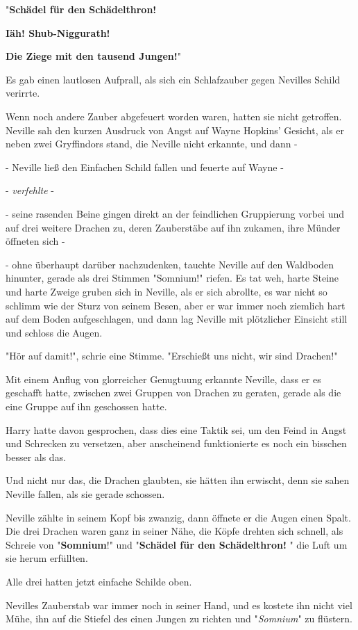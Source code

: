 {"\textbf{Schädel für den Schädelthron!}

\textbf{Iäh! Shub-Niggurath!}

\textbf{Die Ziege mit den tausend Jungen!}"

Es gab einen lautlosen Aufprall, als sich ein Schlafzauber gegen Nevilles Schild verirrte.

Wenn noch andere Zauber abgefeuert worden waren, hatten sie nicht getroffen. Neville sah den kurzen Ausdruck von Angst auf Wayne Hopkins' Gesicht, als er neben zwei Gryffindors stand, die Neville nicht erkannte, und dann -

- Neville ließ den Einfachen Schild fallen und feuerte auf Wayne -

- \emph{verfehlte} -

- seine rasenden Beine gingen direkt an der feindlichen Gruppierung vorbei und auf drei weitere Drachen zu, deren Zauberstäbe auf ihn zukamen, ihre Münder öffneten sich -

- ohne überhaupt darüber nachzudenken, tauchte Neville auf den Waldboden hinunter, gerade als drei Stimmen "Somnium!" riefen. Es tat weh, harte Steine und harte Zweige gruben sich in Neville, als er sich abrollte, es war nicht so schlimm wie der Sturz von seinem Besen, aber er war immer noch ziemlich hart auf dem Boden aufgeschlagen, und dann lag Neville mit plötzlicher Einsicht still und schloss die Augen.

"Hör auf damit!", schrie eine Stimme. "Erschießt uns nicht, wir sind Drachen!"

Mit einem Anflug von glorreicher Genugtuung erkannte Neville, dass er es geschafft hatte, zwischen zwei Gruppen von Drachen zu geraten, gerade als die eine Gruppe auf ihn geschossen hatte.

Harry hatte davon gesprochen, dass dies eine Taktik sei, um den Feind in Angst und Schrecken zu versetzen, aber anscheinend funktionierte es noch ein bisschen besser als das.

Und nicht nur das, die Drachen glaubten, sie hätten ihn erwischt, denn sie sahen Neville fallen, als sie gerade schossen.

Neville zählte in seinem Kopf bis zwanzig, dann öffnete er die Augen einen Spalt. Die drei Drachen waren ganz in seiner Nähe, die Köpfe drehten sich schnell, als Schreie von "\textbf{Somnium}!" und "\textbf{Schädel für den Schädelthron!} " die Luft um sie herum erfüllten.

Alle drei hatten jetzt einfache Schilde oben.

Nevilles Zauberstab war immer noch in seiner Hand, und es kostete ihn nicht viel Mühe, ihn auf die Stiefel des einen Jungen zu richten und "\emph{Somnium}" zu flüstern.

}
